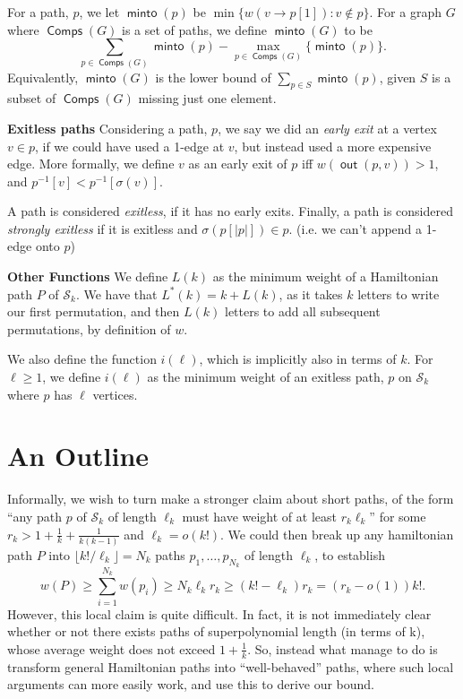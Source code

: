 \documentclass{article}
\DeclareMathOperator{\minto}{\bm{\mathsf{minto}}}
\DeclareMathOperator{\out}{\bm{\mathsf{out}}}
\DeclareMathOperator{\Comp}{\bm{\mathsf{Comps}}}
\newcommand{\edit}[1]{}%
\begin{document}
For a path, $p$, we let $\minto(p)$ be $\min\{ w(v \to p[1]): v \not \in p\}$. For a graph $G$ where $\Comp(G)$ is a set of paths, we define $\minto(G)$ to be \[\sum_{p \in \Comp(G)} \minto(p) - \max_{p \in \Comp(G)}\{\minto(p)\}.\]
Equivalently, $\minto(G)$ is the lower bound of $\sum_{p \in S} \minto(p)$, given $S$ is a subset of $\Comp(G)$ missing just one element.

\vspace{1.75em}

\textbf{Exitless paths} Considering a path, $p$, we say we did an \textit{early exit} at a vertex $v \in p$, if we could have used a 1-edge at $v$, but instead used a more expensive edge. More formally, we define $v$ as an early exit of $p$ iff $w(\out(p,v)) > 1$, and $p^{-1}[v] < p^{-1}[\sigma(v)]$.

A path is considered \textit{exitless}, if it has no early exits. Finally, a path is considered \textit{strongly exitless} if it is exitless and $\sigma(p[|p|]) \in p$. (i.e. we can't append a 1-edge onto $p$)

\vspace{1.75em}

\textbf{Other Functions} We define $L(k)$ as the minimum weight of a Hamiltonian path $P$ of $\mathcal{S}_k$. We have that $L^*(k) = k+L(k)$, as it takes $k$ letters to write our first permutation, and then $L(k)$ letters to add all subsequent permutations, by definition of $w$.

We also define the function $i(\ell)$, which is implicitly also in terms of $k$. For $\ell \geq 1$, we define $i(\ell)$ as the minimum weight of an exitless path, $p$ on $\mathcal{S}_k$ where $p$ has $\ell$ vertices.

\section{An Outline}\edit{ needs a lot of work, sloppy currently; one can potentially find this useful as is, but is}

Informally, we wish to turn make a stronger claim about short paths, of the form ``any path $p$ of $\mathcal{S}_k$ of length $\ell_k$ must have weight of at least $r_k\ell_k$'' for some $r_k > 1 + \frac{1}{k} + \frac{1}{k(k-1)}$ and $\ell_k =o(k!)$. We could then break up any hamiltonian path $P$ into $\lfloor k!/\ell_k \rfloor = N_k$ paths $p_1,\dots, p_{N_k}$ of length $\ell_k$, to establish \[w(P) \ge \sum_{i=1}^{N_k} w(p_i) \ge N_k\ell_kr_k \ge (k!-\ell_k)r_k = (r_k-o(1))k! .\]However, this local claim is quite difficult. In fact, it is not immediately clear whether or not there exists paths of superpolynomial length (in terms of k), whose average weight does not exceed $1+\frac{1}{k}$. So, instead what manage to do is transform general Hamiltonian paths into ``well-behaved'' paths, where such local arguments can more easily work, and use this to derive our bound. 
\end{document}
